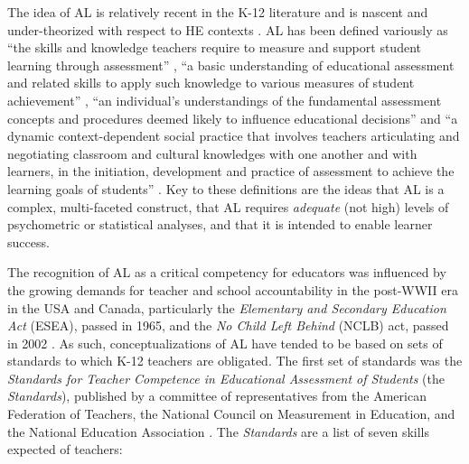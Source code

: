 \documentclass[
]{book}
\begin{document}
The idea of AL is relatively recent in the K-12 literature and is nascent and under-theorized with respect to HE contexts \citep{medlandExaminingAssessmentLiteracy2015}. AL has been defined variously as ``the skills and knowledge teachers require to measure and support student learning through assessment'' \citep{delucaApproachesClassroomAssessment2016}, ``a basic understanding of educational assessment and related skills to apply such knowledge to various measures of student achievement'' \citep{xuTeacherAssessmentLiteracy2016}, ``an individual's understandings of the fundamental assessment concepts and procedures deemed likely to influence educational decisions'' \citep{pophamAssessmentLiteracyOverlooked2011} and ``a dynamic context-dependent social practice that involves teachers articulating and negotiating classroom and cultural knowledges with one another and with learners, in the initiation, development and practice of assessment to achieve the learning goals of students'' \citep{willisConceptualisingTeachersAssessment2013}. Key to these definitions are the ideas that AL is a complex, multi-faceted construct, that AL requires \emph{adequate} (not high) levels of psychometric or statistical analyses, and that it is intended to enable learner success.

The recognition of AL as a critical competency for educators was influenced by the growing demands for teacher and school accountability in the post-WWII era in the USA and Canada, particularly the \emph{Elementary and Secondary Education Act} (ESEA), passed in 1965, and the \emph{No Child Left Behind} (NCLB) act, passed in 2002 \citep[see][ for a detailed discussion]{delucaPreparingTeachersAge2012}. As such, conceptualizations of AL have tended to be based on sets of standards to which K-12 teachers are obligated. The first set of standards was the \emph{Standards for Teacher Competence in Educational Assessment of Students} (the \emph{Standards}), published by a committee of representatives from the American Federation of Teachers, the National Council on Measurement in Education, and the National Education Association \citep{StandardsTeacherCompetence1990}. The \emph{Standards} are a list of seven skills expected of teachers:
\end{document}
